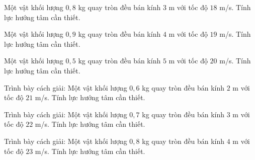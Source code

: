 \begin{ex}
Một vật khối lượng $0,8$ kg quay tròn đều bán kính $3$ m với tốc độ $18$ m/s. Tính lực hướng tâm cần thiết.
\end{ex}

\begin{ex}
Một vật khối lượng $0,9$ kg quay tròn đều bán kính $4$ m với tốc độ $19$ m/s. Tính lực hướng tâm cần thiết.
\end{ex}

\begin{ex}
Một vật khối lượng $0,5$ kg quay tròn đều bán kính $5$ m với tốc độ $20$ m/s. Tính lực hướng tâm cần thiết.
\end{ex}

\begin{bt}
Trình bày cách giải: Một vật khối lượng $0,6$ kg quay tròn đều bán kính $2$ m với tốc độ $21$ m/s. Tính lực hướng tâm cần thiết.
\end{bt}

\begin{bt}
Trình bày cách giải: Một vật khối lượng $0,7$ kg quay tròn đều bán kính $3$ m với tốc độ $22$ m/s. Tính lực hướng tâm cần thiết.
\end{bt}

\begin{bt}
Trình bày cách giải: Một vật khối lượng $0,8$ kg quay tròn đều bán kính $4$ m với tốc độ $23$ m/s. Tính lực hướng tâm cần thiết.
\end{bt}

